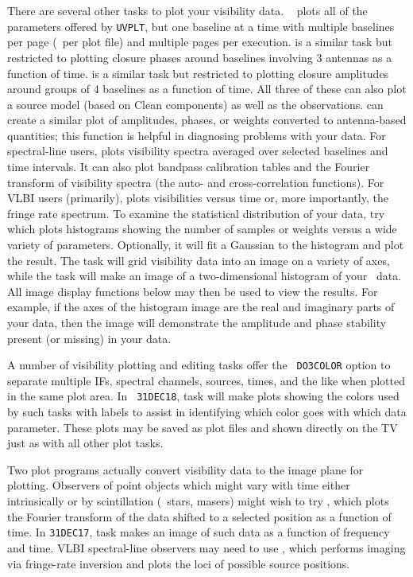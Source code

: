      There are several other tasks to plot your visibility data.  {\tt
{}} plots all of the parameters offered by {\tt UVPLT}, but
one baseline at a time with multiple baselines per page (\ie\ per plot
file) and multiple pages per execution.  {\tt {}} is a
similar task but restricted to plotting closure phases around baselines
involving 3 antennas as a function of time.  {\tt {}} is a
similar task but restricted to plotting closure amplitudes around
groups of 4 baselines as a function of time.  All three of these
can also plot a source model (based on Clean components) as well as
the observations.  {\tt {}} can create a similar plot of
amplitudes, phases, or weights converted to antenna-based quantities;
this function is helpful in diagnosing problems with your data.  For
spectral-line users, {\tt {}} plots visibility spectra
averaged over selected baselines and time intervals.  It can also plot
bandpass calibration tables and the Fourier transform of visibility
spectra (the auto- and cross-correlation functions).  For VLBI users
(primarily), {\tt {}} plots visibilities versus time or,
more importantly, the fringe rate spectrum.  To examine the
statistical distribution of your data, try {\tt {}} which
plots histograms showing the number of samples or weights versus a
wide variety of parameters. Optionally, it will fit a Gaussian to the
histogram and plot the result.  The task {\tt {}} will grid
visibility data into an image on a variety of axes, while the task
{\tt {}} will make an image of a two-dimensional histogram
of your \uv\ data.  All image display functions below may then be used
to view the results.  For example, if the axes of the histogram image
are the real and imaginary parts of your data, then the image will
demonstrate the amplitude and phase stability present (or missing) in
your data.

     A number of visibility plotting and editing tasks offer the {\tt
DO3COLOR} option to separate multiple IFs, spectral channels, sources,
times, and the like when plotted in the same plot area.  In {\tt
31DEC18}, task {\tt {}} will make plots showing the colors
used by such tasks with labels to assist in identifying which color
goes with which data parameter.  These plots may be saved as plot
files and shown directly on the TV just as with all other plot tasks.

     Two plot programs actually convert visibility data to the image
plane for plotting.   Observers of point objects which might vary with
time either intrinsically or by scintillation (\eg\ stars, masers)
might wish to try {\tt {}}, which plots the Fourier
transform of the data shifted to a selected position as a function of
time.  In {\tt 31DEC17}, task {\tt {}} makes an image of
such data as a function of frequency and time.  VLBI spectral-line
observers may need to use {\tt {}}, which performs imaging
via fringe-rate inversion and plots the loci of possible source
positions.

